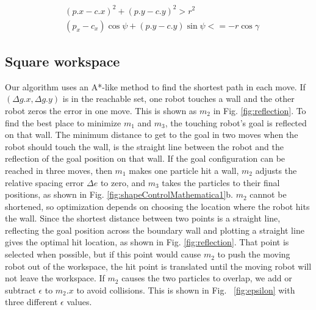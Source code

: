 \begin{align}
&(p.x - c.x)^2 + (p.y - c.y)^2  > r^2\\
 &(p_x - c_x) \cos\psi + (p.y- c.y) \sin\psi <= -r \cos\gamma
\end{align}
   

 \subsection{Square workspace}
Our algorithm uses an A*-like method to find the shortest path in each move. 
If $(\Delta g.x, \Delta g.y)$ is in the reachable set, one robot touches a wall and the other robot zeros the error in one move. This is shown as $m_2$ in Fig. \ref{fig:reflection}. To find the best place to minimize $m_1$ and $m_3$, the touching robot's goal is reflected on that wall. 
The minimum distance to get to the goal in two moves when the robot should touch the wall, is the straight line between the robot and the reflection of the goal position on that wall. 
If the goal configuration can be reached in three moves, then $m_1$  makes one particle hit a wall, $m_2$ adjusts the relative spacing error $\Delta e$ to zero, and  $m_3$ takes the particles to their final positions, as shown in Fig. \ref{fig:shapeControlMathematica1}b. 
$m_2$ cannot be shortened, so optimization depends on choosing the location where the robot hits the wall. 
 Since the shortest distance between two points is a straight line, reflecting the goal position across the boundary wall and plotting a straight line gives the optimal hit location, as shown in Fig. \ref{fig:reflection}.
That point is selected when possible, but if this point would cause $m_2$ to push the moving robot out of the workspace, the hit point is translated until the moving robot will not leave the workspace. If $m_2$ causes the two particles to overlap, we add or subtract $\epsilon$ to $m_2.x$ to avoid collisions. This is shown in Fig. ~\ref{fig:epsilon} with three different $\epsilon$ values.



